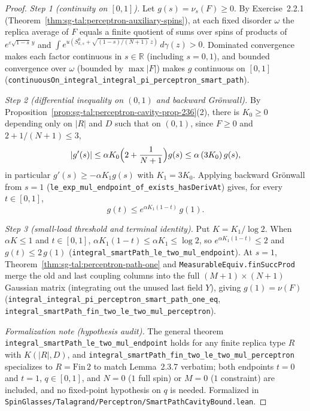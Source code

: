 \begin{proof}
  \leanok
\emph{Step 1 (continuity on $[0,1]$).} Let $g(s)=\nu_s(F)\ge0$. By Exercise~2.2.1 (Theorem~\ref{thm:sg-tal:perceptron-auxiliary-spins}), at each
fixed disorder $\omega$ the replica average of $F$ equals a finite quotient of sums over spins of products of
$e^{\varepsilon\sqrt{1-s}\,y}$ and $\int e^{u(S^0_{k,s}+\sqrt{(1-s)/(N+1)}\,z)}\,d\gamma(z)>0$. Dominated convergence makes each factor continuous
in $s\in\mathbb R$ (including $s=0,1$), and bounded convergence over $\omega$ (bounded by $\max|F|$) makes $g$ continuous on $[0,1]$
(\texttt{continuousOn\_integral\_integral\_pi\_perceptron\_smart\_path}).

\emph{Step 2 (differential inequality on $(0,1)$ and backward Gr\"onwall).} By Proposition~\ref{prop:sg-tal:perceptron-cavity-prop-236}(2), there is
$K_0\ge0$ depending only on $|R|$ and $D$ such that on $(0,1)$, since $F\ge0$ and $2+1/(N+1)\le3$,
\[
 |g'(s)|\le\alpha K_0\Bigl(2+\frac{1}{N+1}\Bigr)g(s)\le\alpha\,(3K_0)\,g(s),
\]
in particular $g'(s)\ge-\alpha K_1 g(s)$ with $K_1=3K_0$. Applying backward Gr\"onwall from $s=1$
(\texttt{le\_exp\_mul\_endpoint\_of\_exists\_hasDerivAt}) gives, for every $t\in[0,1]$,
\[
 g(t)\le e^{\alpha K_1(1-t)}\,g(1).
\]

\emph{Step 3 (small-load threshold and terminal identity).} Put $K=K_1/\log 2$. When $\alpha K\le1$ and $t\in[0,1]$, $\alpha K_1(1-t)\le\alpha K_1\le\log 2$,
so $e^{\alpha K_1(1-t)}\le2$ and $g(t)\le2\,g(1)$ (\texttt{integral\_smartPath\_le\_two\_mul\_endpoint}). At $s=1$, Theorem~\ref{thm:sg-tal:perceptron-path-one}
and \texttt{MeasurableEquiv.finSuccProd} merge the old and last coupling columns into the full $(M+1)\times(N+1)$ Gaussian matrix (integrating out the unused
last field $Y$), giving $g(1)=\nu(F)$ (\texttt{integral\_integral\_pi\_perceptron\_smart\_path\_one\_eq},
\texttt{integral\_smartPath\_fin\_two\_le\_two\_mul\_perceptron}).

\emph{Formalization note (hypothesis audit).} The general theorem \texttt{integral\_smartPath\_le\_two\_mul\_endpoint} holds for any finite replica type $R$
with $K(|R|,D)$, and \texttt{integral\_smartPath\_fin\_two\_le\_two\_mul\_perceptron} specializes to $R=\mathrm{Fin}\,2$ to match Lemma~2.3.7 verbatim;
both endpoints $t=0$ and $t=1$, $q\in[0,1]$, and $N=0$ ($1$ full spin) or $M=0$ ($1$ constraint) are included, and no fixed-point hypothesis on $q$ is needed.
Formalized in \texttt{SpinGlasses/Talagrand/Perceptron/SmartPathCavityBound.lean}.
\end{proof}

